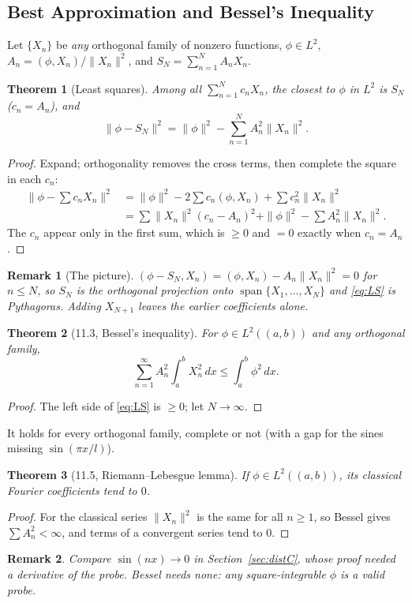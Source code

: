 \documentclass{article}
\newtheorem{theorem}{Theorem}
\newtheorem{remark}{Remark}
\newcommand{\Span}{\operatorname{span}}
\begin{document}
\subsection{Best Approximation and Bessel's Inequality}
Let $\{X_n\}$ be \emph{any} orthogonal family of nonzero functions, $\phi \in L^2$, $A_n = (\phi,X_n)/\|X_n\|^2$, and $S_N = \sum_{n=1}^N A_nX_n$.
\begin{theorem}[Least squares]
    Among all $\sum_{n=1}^N c_nX_n$, the closest to $\phi$ in $L^2$ is $S_N$ ($c_n = A_n$), and
    \begin{equation}\label{eq:LS}
        \|\phi - S_N\|^2 = \|\phi\|^2 - \sum_{n=1}^N A_n^2\|X_n\|^2.
    \end{equation}
\end{theorem}
\begin{proof}
    Expand; orthogonality removes the cross terms, then complete the square in each $c_n$:
    \begin{align}
        \Big\|\phi - \sum c_nX_n\Big\|^2 &= \|\phi\|^2 - 2\sum c_n(\phi,X_n) + \sum c_n^2\|X_n\|^2 \\
        &= \sum\|X_n\|^2(c_n - A_n)^2 + \|\phi\|^2 - \sum A_n^2\|X_n\|^2.
    \end{align}
    The $c_n$ appear only in the first sum, which is $\geq 0$ and $= 0$ exactly when $c_n = A_n$.
\end{proof}
\begin{remark}[The picture]
    $(\phi - S_N, X_n) = (\phi,X_n) - A_n\|X_n\|^2 = 0$ for $n \leq N$, so $S_N$ is the orthogonal projection onto $\Span\{X_1,\dots,X_N\}$ and \eqref{eq:LS} is Pythagoras. Adding $X_{N+1}$ leaves the earlier coefficients alone.
\end{remark}
\begin{theorem}[11.3, Bessel's inequality]
    For $\phi \in L^2((a,b))$ and any orthogonal family,
    \begin{equation}
        \sum_{n=1}^\infty A_n^2\int_a^b X_n^2\,dx \leq \int_a^b\phi^2\,dx.
    \end{equation}
\end{theorem}
\begin{proof}
    The left side of \eqref{eq:LS} is $\geq 0$; let $N \to \infty$.
\end{proof}
It holds for every orthogonal family, complete or not (with a gap for the sines missing $\sin(\pi x/l)$).
\begin{theorem}[11.5, Riemann--Lebesgue lemma]
    If $\phi \in L^2((a,b))$, its classical Fourier coefficients tend to $0$.
\end{theorem}
\begin{proof}
    For the classical series $\|X_n\|^2$ is the same for all $n \geq 1$, so Bessel gives $\sum A_n^2 < \infty$, and terms of a convergent series tend to $0$.
\end{proof}
\begin{remark}
    Compare $\sin(nx) \to 0$ in Section~\ref{sec:distC}, whose proof needed a derivative of the probe. Bessel needs none: any square-integrable $\phi$ is a valid probe.
\end{remark}
\end{document}
